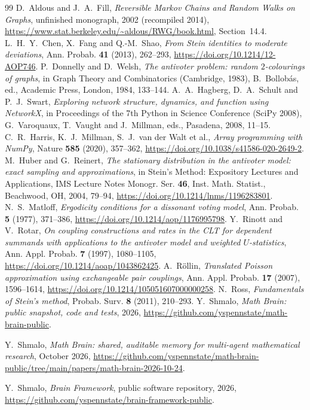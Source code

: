 \documentclass[11pt]{amsart}
\theoremstyle{remark}
\numberwithin{equation}{section}
\begin{document}
\begin{thebibliography}{99}
 D.~Aldous and J.~A.~Fill, \emph{Reversible Markov Chains and Random Walks on Graphs}, unfinished
monograph, 2002 (recompiled 2014), \url{https://www.stat.berkeley.edu/~aldous/RWG/book.html}, Section~14.4.
 L.~H.~Y.~Chen, X.~Fang and Q.-M.~Shao, \emph{From Stein identities to moderate deviations}, Ann. Probab.
\textbf{41} (2013), 262--293, \url{https://doi.org/10.1214/12-AOP746}.
 P.~Donnelly and D.~Welsh, \emph{The antivoter problem: random $2$-colourings of graphs}, in Graph Theory
and Combinatorics (Cambridge, 1983), B.~Bollob\'as, ed., Academic Press, London, 1984, 133--144.
 A.~A.~Hagberg, D.~A.~Schult and P.~J.~Swart, \emph{Exploring network structure, dynamics, and function
using NetworkX}, in Proceedings of the 7th Python in Science Conference (SciPy 2008), G.~Varoquaux, T.~Vaught and
J.~Millman, eds., Pasadena, 2008, 11--15.
 C.~R.~Harris, K.~J.~Millman, S.~J.~van der Walt et al., \emph{Array programming with NumPy}, Nature
\textbf{585} (2020), 357--362, \url{https://doi.org/10.1038/s41586-020-2649-2}.
 M.~Huber and G.~Reinert, \emph{The stationary distribution in the antivoter model: exact sampling and
approximations}, in Stein's Method: Expository Lectures and Applications, IMS Lecture Notes Monogr. Ser.
\textbf{46}, Inst. Math. Statist., Beachwood, OH, 2004, 79--94, \url{https://doi.org/10.1214/lnms/1196283801}.
 N.~S.~Matloff, \emph{Ergodicity conditions for a dissonant voting model}, Ann. Probab. \textbf{5}
(1977), 371--386, \url{https://doi.org/10.1214/aop/1176995798}.
 Y.~Rinott and V.~Rotar, \emph{On coupling constructions and rates in the CLT for dependent summands with
applications to the antivoter model and weighted $U$-statistics}, Ann. Appl. Probab. \textbf{7} (1997), 1080--1105,
\url{https://doi.org/10.1214/aoap/1043862425}.
 A.~R\"ollin, \emph{Translated Poisson approximation using exchangeable pair couplings}, Ann. Appl.
Probab. \textbf{17} (2007), 1596--1614, \url{https://doi.org/10.1214/105051607000000258}.
 N.~Ross, \emph{Fundamentals of Stein's method}, Probab. Surv. \textbf{8} (2011), 210--293.
 Y.~Shmalo, \emph{Math Brain: public snapshot, code and tests}, 2026, \url{https://github.com/yspennstate/math-brain-public}.

 Y.~Shmalo, \emph{Math Brain: shared, auditable memory for multi-agent mathematical research}, October 2026, \url{https://github.com/yspennstate/math-brain-public/tree/main/papers/math-brain-2026-10-24}.

 Y.~Shmalo, \emph{Brain Framework}, public software repository, 2026, \url{https://github.com/yspennstate/brain-framework-public}.

\end{thebibliography}
\end{document}
